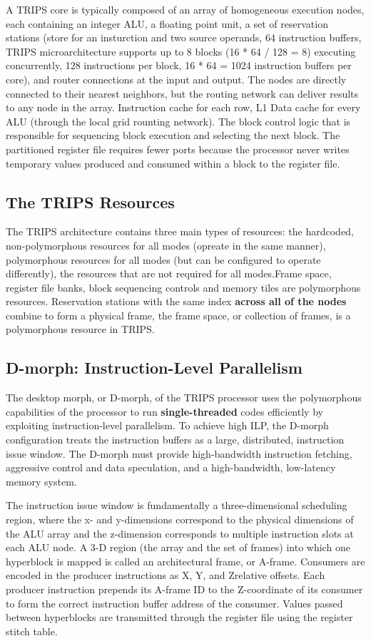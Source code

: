 \documentclass[UTF8,12pt,a4paper]{article}
\begin{document}
A TRIPS core is typically composed of an array of homogeneous execution nodes,
each containing an integer ALU, a floating point unit, a set of reservation stations
(store for an insturction and two source operands, 64 instruction buffers,
TRIPS microarchitecture supports up to 8 blocks (16 * 64 / 128 = 8) executing concurrently,
128 instructions per block, 16 * 64 = 1024 instruction buffers per core),
and router connections at the input and output.
The nodes are directly connected to their nearest neighbors,
but the routing network can deliver results to any node in the array.
Instruction cache for each row, L1 Data cache for every ALU (through the local grid rounting network).
The block control logic that is responsible for sequencing block execution and selecting the next block.
The partitioned register file requires fewer ports because the processor never
writes temporary values produced and consumed within a block to the register file.

\subsection{The TRIPS Resources}
The TRIPS architecture contains three main types of resources: 
the hardcoded, non-polymorphous resources for all modes (opreate in the same manner),
polymorphous resources for all modes (but can be configured to operate differently),
the resources that are not required for all modes.Frame space, register file banks,
block sequencing controls and memory tiles are polymorphous resources.
Reservation stations with the same index \textbf{across all of the nodes} combine to form a physical frame,
the frame space, or collection of frames, is a polymorphous resource in TRIPS.

\subsection{D-morph: Instruction-Level Parallelism}
The desktop morph, or D-morph, of the TRIPS processor
uses the polymorphous capabilities of the processor
to run \textbf{single-threaded} codes efficiently by exploiting
instruction-level parallelism.
To achieve high ILP, the D-morph configuration treats
the instruction buffers as a large, distributed, instruction issue window.
The D-morph must provide high-bandwidth instruction fetching,
aggressive control and data speculation, and a high-bandwidth, low-latency memory system.

The instruction issue window is fundamentally a three-dimensional scheduling region,
where the x- and y-dimensions correspond to the physical dimensions of the ALU array
and the z-dimension corresponds to multiple instruction slots at each ALU node.
A 3-D region (the array and the set of frames) into
which one hyperblock is mapped is called an architectural frame, or A-frame.
Consumers are encoded in the producer instructions as X, Y, and Zrelative offsets.
Each producer instruction prepends its A-frame ID to the Z-coordinate of its consumer to
form the correct instruction buffer address of the consumer.
Values passed between hyperblocks are transmitted through
the register file using the register stitch table.
\end{document}
